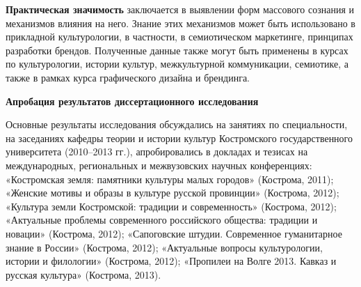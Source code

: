 \textbf{Практическая значимость} заключается в выявлении форм массового сознания и механизмов влияния на него. Знание этих механизмов может быть использовано в прикладной культурологии, в частности, в семиотическом маркетинге, принципах разработки брендов. Полученные данные также могут быть применены в курсах по культурологии, истории культур, межкультурной коммуникации, семиотике, а также в рамках курса графического дизайна и брендинга.

\textbf{Апробация результатов диссертационного исследования}

Основные результаты исследования обсуждались на занятиях по специальности, на заседаниях кафедры теории и истории культур Костромского государственного университета (2010–2013 гг.), апробировались в докладах и тезисах на международных, региональных и межвузовских научных конференциях: «Костромская земля: памятники культуры малых городов» (Кострома, 2011); «Женские мотивы и образы в культуре русской провинции» (Кострома, 2012); «Культура земли Костромской: традиции и современность» (Кострома, 2012); «Актуальные проблемы современного российского общества: традиции и новации» (Кострома, 2012); «Сапоговские штудии. Современное гуманитарное знание в России» (Кострома, 2012); «Актуальные вопросы культурологии, истории и филологии» (Кострома, 2012); «Пропилеи на Волге 2013. Кавказ и русская культура» (Кострома, 2013). 

